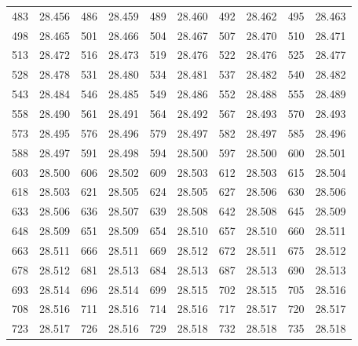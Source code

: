 \documentclass[12pt]{ctexart}
\numberwithin{equation}{section}
\begin{document}
\begin{longtable}{cc|cc|cc|cc|cc}
    483      & 28.456   & 486      & 28.459   & 489      & 28.460   & 492      & 28.462   & 495      & 28.463   \\
    498      & 28.465   & 501      & 28.466   & 504      & 28.467   & 507      & 28.470   & 510      & 28.471   \\
    513      & 28.472   & 516      & 28.473   & 519      & 28.476   & 522      & 28.476   & 525      & 28.477   \\
    528      & 28.478   & 531      & 28.480   & 534      & 28.481   & 537      & 28.482   & 540      & 28.482   \\
    543      & 28.484   & 546      & 28.485   & 549      & 28.486   & 552      & 28.488   & 555      & 28.489   \\
    558      & 28.490   & 561      & 28.491   & 564      & 28.492   & 567      & 28.493   & 570      & 28.493   \\
    573      & 28.495   & 576      & 28.496   & 579      & 28.497   & 582      & 28.497   & 585      & 28.496   \\
    588      & 28.497   & 591      & 28.498   & 594      & 28.500   & 597      & 28.500   & 600      & 28.501   \\
    603      & 28.500   & 606      & 28.502   & 609      & 28.503   & 612      & 28.503   & 615      & 28.504   \\
    618      & 28.503   & 621      & 28.505   & 624      & 28.505   & 627      & 28.506   & 630      & 28.506   \\
    633      & 28.506   & 636      & 28.507   & 639      & 28.508   & 642      & 28.508   & 645      & 28.509   \\
    648      & 28.509   & 651      & 28.509   & 654      & 28.510   & 657      & 28.510   & 660      & 28.511   \\
    663      & 28.511   & 666      & 28.511   & 669      & 28.512   & 672      & 28.511   & 675      & 28.512   \\
    678      & 28.512   & 681      & 28.513   & 684      & 28.513   & 687      & 28.513   & 690      & 28.513   \\
    693      & 28.514   & 696      & 28.514   & 699      & 28.515   & 702      & 28.515   & 705      & 28.516   \\
    708      & 28.516   & 711      & 28.516   & 714      & 28.516   & 717      & 28.517   & 720      & 28.517   \\
    723      & 28.517   & 726      & 28.516   & 729      & 28.518   & 732      & 28.518   & 735      & 28.518   \\

\end{longtable}
\end{document}
